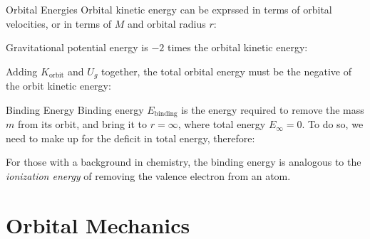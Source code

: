 \documentclass[12pt,compress,aspectratio=169]{beamer}
\begin{document}
\begin{frame}{Orbital Energies}
  Orbital kinetic energy can be exprssed in terms of orbital velocities, or
  in terms of $M$ and orbital radius $r$:

  
  Gravitational potential energy is $-2$ times the orbital kinetic energy:
  

  Adding $K_\text{orbit}$ and $U_g$ together, the total orbital
  energy must be the negative of the orbit kinetic energy:
  
\end{frame}


\begin{frame}{Binding Energy}
  Binding energy $E_\text{binding}$ is the energy required to remove the mass
  $m$ from its orbit, and bring it to $r=\infty$, where total energy
  $E_\infty=0$. To do so, we need to make up for the deficit
  in total energy, therefore:


  For those with a background in chemistry, the binding energy is analogous to
  the \emph{ionization energy} of removing the valence electron from an atom.
\end{frame}


%
%
%
%  
%



\section{Orbital Mechanics}
\end{document}
